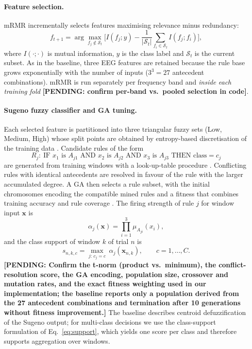 \documentclass[11pt,a4paper]{article}
\newcommand{\pending}[1]{\textcolor{red!75!black}{\textbf{[PENDING: #1]}}}
\begin{document}
\paragraph{Feature selection.}
mRMR \cite{Peng2005} incrementally selects features maximising relevance minus redundancy:
\begin{equation}
f_{t+1} = \arg\max_{f_j\notin\mathcal{S}_t}\Big[I(f_j;y) - \frac{1}{|\mathcal{S}_t|}\sum_{f_i\in\mathcal{S}_t} I(f_j;f_i)\Big],
\end{equation}
where $I(\cdot;\cdot)$ is mutual information, $y$ is the class label and $\mathcal{S}_t$ is the current subset. As in the baseline, three EEG features are retained because the rule base grows exponentially with the number of inputs ($3^3=27$ antecedent combinations). mRMR is run separately per frequency band and \emph{inside each training fold} \pending{confirm per-band vs.\ pooled selection in code}.

\paragraph{Sugeno fuzzy classifier and GA tuning.}
Each selected feature is partitioned into three triangular fuzzy sets (Low, Medium, High) whose split points are obtained by entropy-based discretisation of the training data \cite{FarhadiSedehi2024a}. Candidate rules of the form
\begin{equation}
R_j:\ \text{IF } x_1 \text{ is } A_{j1} \text{ AND } x_2 \text{ is } A_{j2} \text{ AND } x_3 \text{ is } A_{j3} \text{ THEN class} = c_j
\end{equation}
are generated from training windows with a look-up-table procedure \cite{WangMendel1992}. Conflicting rules with identical antecedents are resolved in favour of the rule with the larger accumulated degree. A GA then selects a rule subset, with the initial chromosomes encoding the compatible mined rules and a fitness that combines training accuracy and rule coverage \cite{FarhadiSedehi2024a}. The firing strength of rule $j$ for window input $\mathbf{x}$ is
\begin{equation}
\alpha_j(\mathbf{x}) = \prod_{i=1}^{3}\mu_{A_{ji}}(x_i),
\label{eq:firing}
\end{equation}
and the class support of window $k$ of trial $n$ is
\begin{equation}
s_{n,k,c} = \max_{j:\,c_j=c}\ \alpha_j(\mathbf{x}_{n,k}),\qquad c=1,\dots,C.
\label{eq:support}
\end{equation}
\pending{Confirm the t-norm (product vs.\ minimum), the conflict-resolution score, the GA encoding, population size, crossover and mutation rates, and the exact fitness weighting used in our implementation; the baseline reports only a population derived from the 27 antecedent combinations and termination after 10 generations without fitness improvement.} The baseline describes centroid defuzzification of the Sugeno output; for multi-class decisions we use the class-support formulation of Eq.~\eqref{eq:support}, which yields one score per class and therefore supports aggregation over windows.
\end{document}
